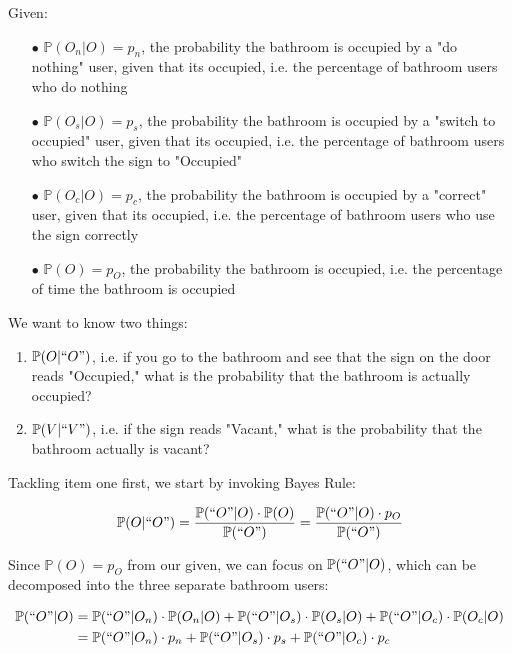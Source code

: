 \documentclass[12 pt]{article}
\begin{document}
\begin{flushleft}

Given:
\begin{enumerate}
\item[$\bullet$]{$\mathbb{P}(O_n|O) = p_n$, the probability the bathroom is occupied by a "do nothing" user, given that its occupied, i.e. the percentage of bathroom users who do nothing}
\item[$\bullet$]{$\mathbb{P}(O_s|O) = p_s$, the probability the bathroom is occupied by a "switch to occupied" user, given that its occupied, i.e. the percentage of bathroom users who switch the sign to "Occupied"}
\item[$\bullet$]{$\mathbb{P}(O_c|O) = p_c$, the probability the bathroom is occupied by a "correct" user, given that its occupied, i.e. the percentage of bathroom users who use the sign correctly}
\item[$\bullet$]{$\mathbb{P}(O) = p_O$, the probability the bathroom is occupied, i.e. the percentage of time the bathroom is occupied}
\end{enumerate}

We want to know two things:
\begin{enumerate}
\item{$\mathbb{P}(O|``O")$, i.e. if you go to the bathroom and see that the sign on the door reads "Occupied," what is the probability that the bathroom is actually occupied?}
\item{$\mathbb{P}(V|``V")$, i.e. if the sign reads "Vacant," what is the probability that the bathroom actually is vacant?}
\end{enumerate}

Tackling item one first, we start by invoking Bayes Rule:

$$ \mathbb{P}(O|``O") = \frac{\mathbb{P}(``O"|O) \cdot \mathbb{P}(O)}{\mathbb{P}(``O")} = \frac{\mathbb{P}(``O"|O) \cdot p_O}{\mathbb{P}(``O")} $$

Since $\mathbb{P}(O) = p_O$ from our given, we can focus on $\mathbb{P}(``O"|O)$, which can be decomposed into the three separate bathroom users:

\begin{align}
\mathbb{P}(``O"|O) &= \mathbb{P}(``O"|O_n) \cdot \mathbb{P}(O_n|O) + \mathbb{P}(``O"|O_s) \cdot \mathbb{P}(O_s|O) + \mathbb{P}(``O"|O_c) \cdot \mathbb{P}(O_c|O) \notag \\
&=\mathbb{P}(``O"|O_n) \cdot p_n + \mathbb{P}(``O"|O_s) \cdot p_s + \mathbb{P}(``O"|O_c) \cdot p_c \notag
\end{align}


\end{flushleft}
\end{document}
